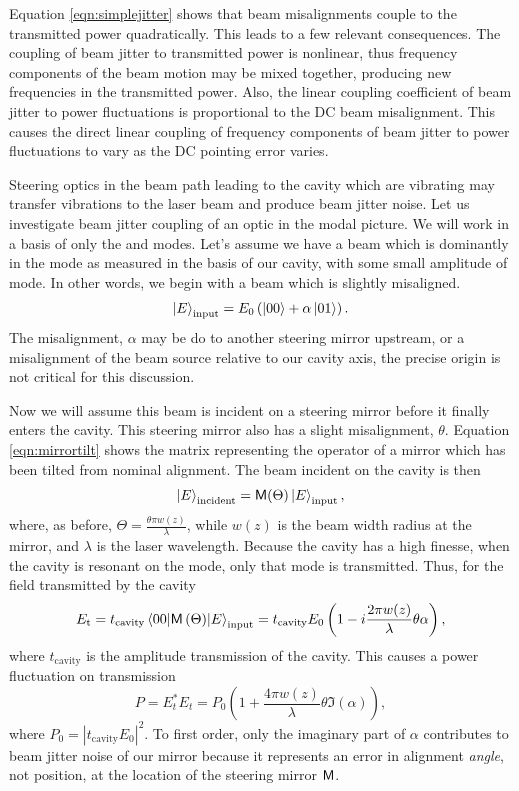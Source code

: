 Equation \ref{eqn:simplejitter} shows that beam misalignments couple to the transmitted power quadratically. %
This leads to a few relevant consequences. %
The coupling of beam jitter to transmitted power is nonlinear, thus frequency components of the beam motion may be mixed together, producing new frequencies in the transmitted power. %
Also, the linear coupling coefficient of beam jitter to power fluctuations is proportional to the DC beam misalignment. %
This causes the direct linear coupling of frequency components of beam jitter to power fluctuations to vary as the DC pointing error varies.

Steering optics in the beam path leading to the cavity which are vibrating may transfer vibrations to the laser beam and produce beam jitter noise. %
Let us investigate beam jitter coupling of an optic in the modal picture. %
 We will work in a basis of only the  and  modes. %
Let's assume we have a beam which is dominantly in the  mode as measured in the basis of our cavity, with some small amplitude of  mode. %
In other words, we begin with a beam which is slightly misaligned.
\begin{equation}
\left| E \right>_{\text{input}}=E_0\left(\left| 00 \right>+\alpha\left| 01 \right>\right).
\end{equation}
The misalignment, $\alpha$ may be do to another steering mirror upstream, or a misalignment of the beam source relative to our cavity axis, the precise origin is not critical for this discussion.

Now we will assume this beam is incident on a steering mirror before it finally enters the cavity. %
This steering mirror also has a slight misalignment, $\theta$. %
Equation \ref{eqn:mirrortilt} shows the matrix representing the operator of a mirror which has been tilted from nominal alignment. %
The beam incident on the cavity is then
\begin{equation}
\left| E \right>_{\text{incident}}=\mathsf{M}(\Theta)\left| E \right>_{\text{input}},
\end{equation}
where, as before, $\Theta=\frac{\theta \pi w(z)}{\lambda}$, while $w(z)$ is the beam width radius at the mirror, and $\lambda$ is the laser wavelength. %
Because the cavity has a high finesse, when the cavity is resonant on the  mode, only that mode is transmitted. %
Thus, for the field transmitted by the cavity
\begin{equation}
E_{\text{t}}=t_{\text{cavity}}\matrixel{00}{\oper{M}\left(\Theta\right)}{E}_{\text{input}}=t_{\text{cavity}}E_0\left(1-i\frac{ 2 \pi w(z)}{\lambda}\theta\alpha\right),
\end{equation}
where $t_{\text{cavity}}$ is the amplitude transmission of the cavity. %
This causes a power fluctuation on transmission
\begin{equation}
\label{eqn:mirrorjitter}
P=E_t^*E_t=P_0\left(1+\frac{4\pi w(z)}{\lambda}\theta\Im(\alpha)\right),
\end{equation}
where $P_0=|t_{\text{cavity}}E_0|^2$. %
To first order, only the imaginary part of $\alpha$ contributes to beam jitter noise of our mirror because it represents an error in alignment \emph{angle}, not position, at the location of the steering mirror $\mathsf{M}$.

